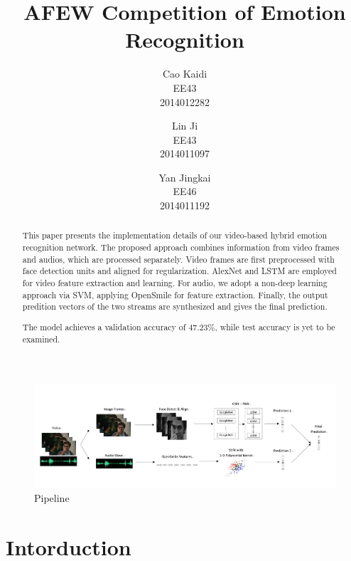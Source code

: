 \documentclass[10pt,twocolumn,letterpaper]{article}
\begin{document}
\title{AFEW Competition of Emotion Recognition}

\author{Cao Kaidi\\
EE43\\
2014012282
\and
Lin Ji\\
EE43\\
2014011097
\and
Yan Jingkai\\
EE46\\
2014011192
}

\maketitle

\begin{abstract}
   This paper presents the implementation details of our video-based hybrid emotion recognition network. The proposed approach combines information from video frames and audios, which are processed separately. Video frames are first preprocessed with face detection units and aligned for regularization. AlexNet and LSTM are employed for video feature extraction and learning. For audio, we adopt a non-deep learning approach via SVM, applying OpenSmile for feature extraction. Finally, the output predition vectors of the two streams are synthesized and gives the final prediction.

   The model achieves a validation accuracy of $47.23\%$, while test accuracy is yet to be examined.
\end{abstract}


\begin{figure}[htpb]
	\centering
	\includegraphics[width = \textwidth]{pic/pipeline.png}
	\caption{Pipeline}
\end{figure}

\section{Intorduction}
\end{document}

